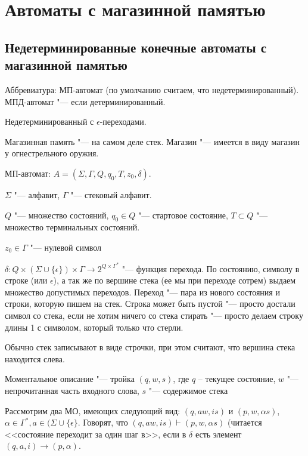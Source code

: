 \section{Автоматы с магазинной памятью}
\subsection{Недетерминированные конечные автоматы с магазинной памятью}
\begin{Rem}
Аббревиатура: МП-автомат (по умолчанию считаем, что недетерминированный). МПД-автомат "--- если детерминированный.
\end{Rem}
\begin{Rem}
Недетерминированный с $\epsilon$-переходами.
\end{Rem}
Магазинная память "--- на самом деле стек. Магазин "--- имеется в виду магазин у огнестрельного оружия.

\begin{Def}
МП-автомат: $A = (\Sigma, \Gamma, Q, q_0, T, z_0, \delta)$.

$\Sigma$ "--- алфавит, $\Gamma$ "--- стековый алфавит.

$Q$ "--- множество состояний, $q_0 \in Q$ "--- стартовое состояние, $T \subset Q$ "--- множество терминальных состояний.

$z_0 \in \Gamma$ "--- нулевой символ

$\delta \colon Q \times (\Sigma \cup \{\epsilon\}) \times \Gamma \to 2^{Q \times \Gamma^*}$ "--- функция перехода. 
По состоянию, символу в строке (или $\epsilon$), а так же по вершине стека (ее мы при переходе сотрем) выдаем множество допустимых переходов.
Переход "--- пара из нового состояния и строки, которую пишем на стек. 
Строка может быть пустой "--- просто достали символ со стека, если не хотим ничего со стека стирать "--- просто делаем строку длины 1 с символом, который только что стерли.
\end{Def}
\begin{Rem}
Обычно стек записывают в виде строчки, при этом считают, что вершина стека находится слева.
\end{Rem}
\begin{Def}
Моментальное описание "--- тройка $(q, w, s)$, где $q$ -- текущее состояние, $w$ "--- непрочитанная часть входного слова, $s$ "--- содержимое стека
\end{Def}

\begin{Def}
Рассмотрим два МО, имеющих следующий вид: $(q, aw, is)$ и $(p, w, \alpha s)$, $\alpha \in \Gamma^*, a \in (\Sigma \cup \{\epsilon\}$.
Говорят, что $(q, aw, is) \vdash (p, w, \alpha s)$ (читается <<состояние переходит за один шаг в>>,  если в $\delta$ есть элемент $(q, a, i) \to (p, \alpha)$.
\end{Def}

